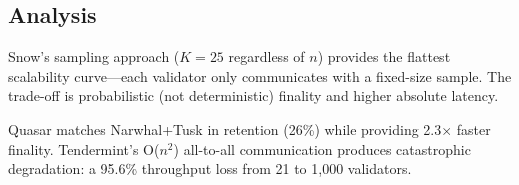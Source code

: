 \subsection{Analysis}

Snow's sampling approach ($K=25$ regardless of $n$) provides the flattest scalability
curve---each validator only communicates with a fixed-size sample. The trade-off is
probabilistic (not deterministic) finality and higher absolute latency.

Quasar matches Narwhal+Tusk in retention (26\%) while providing 2.3$\times$ faster
finality. Tendermint's O($n^2$) all-to-all communication produces catastrophic
degradation: a 95.6\% throughput loss from 21 to 1{,}000 validators.

